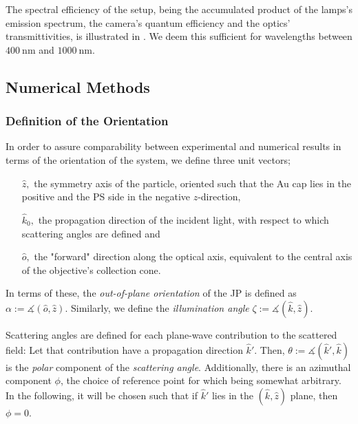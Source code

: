 \documentclass[10pt]{article}
\newcommand{\reffig}[2]{\mbox{\sffamily{Figure \ref{#1}#2}}}
\begin{document}
The spectral efficiency of the setup, being the accumulated product of the lamps's emission spectrum, the camera's quantum efficiency and the optics' transmittivities, is illustrated in \reffig{fig:corrections}{}. 
We deem this sufficient for wavelengths between $\SI{400}{\nano\meter}$ and $\SI{1000}{\nano\meter}$. 






\subsection*{Numerical Methods}

\subsubsection*{Definition of the Orientation}
 

In order to assure comparability between experimental and numerical results in terms of the orientation of the system, we define three unit vectors;  
\begin{itemize}
    \item[$\hat{z},$] the symmetry axis of the particle, oriented such that the Au cap lies in the positive and the PS side in the negative $z$-direction, 
    \item[$\hat{k}_0,$] the propagation direction of the incident light, with respect to which scattering angles are defined and
    \item[$\hat{o},$] the "forward" direction along the optical axis, equivalent to the central axis of the objective's collection cone. 
\end{itemize}
In terms of these, the \emph{out-of-plane orientation} of the JP is defined as
$\alpha := \measuredangle( \hat{o}, \hat{z} )$.
Similarly, we define the \emph{illumination angle} 
$\zeta := \measuredangle( \hat{k}, \hat{z} )$. 

Scattering angles are defined for each plane-wave contribution to the scattered field: 
Let that contribution have a propagation direction $\hat{k}'$. 
Then, \mbox{$\theta := \measuredangle( \hat{k}', \hat{k} )$} is the \emph{polar} component of the \emph{scattering angle}. 
Additionally, there is an azimuthal component $\phi$, the choice of reference point for which being somewhat arbitrary. 
In the following, it will be chosen such that if $\hat{k}'$ lies in the $(\hat{k},\hat{z})$ plane, then $\phi=0$.
\end{document}
